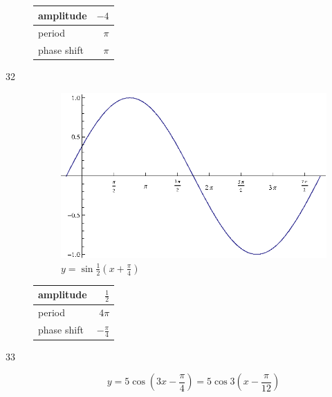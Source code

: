 \documentclass{exam}
\begin{document}
\begin{description}
        \begin{tabular}[H]{lr}
          \toprule
          amplitude & $-4$ \\
          \midrule
          period & $\pi$ \\
          \midrule
          phase shift & $\pi$ \\
          \bottomrule
        \end{tabular}

      \item[32]
        \begin{figure}[H]
          \centering
          \includegraphics[scale=0.8]{exercise32.eps}
          \caption{$y = \sin \frac{1}{2} \left( x + \frac{\pi}{4} \right)$}
        \end{figure}

        \begin{tabular}[H]{lr}
          \toprule
          amplitude & $\frac{1}{2}$ \\
          \midrule
          period & $4 \pi$ \\
          \midrule
          phase shift & $- \frac{\pi}{4}$ \\
          \bottomrule
        \end{tabular}

      \item[33]
        \[
          y = 5 \cos \left( 3x - \frac{\pi}{4} \right) = 5 \cos 3 \left( x - \frac{\pi}{12} \right)
        \]


\end{description}
\end{document}
